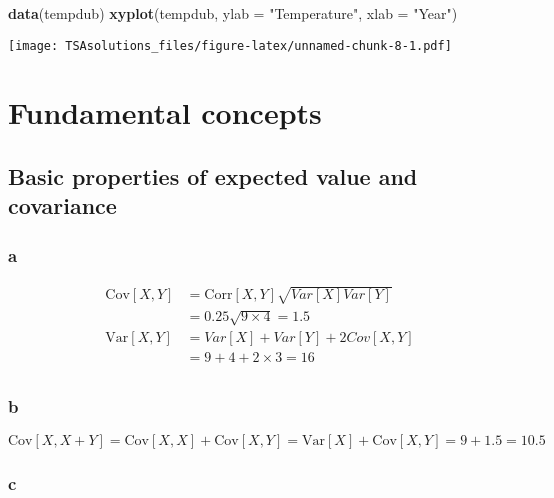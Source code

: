 \documentclass[]{book}
\newenvironment{Shaded}{\begin{snugshade}}{\end{snugshade}}
\newcommand{\KeywordTok}[1]{\textcolor[rgb]{0.13,0.29,0.53}{\textbf{{#1}}}}
\newcommand{\DataTypeTok}[1]{\textcolor[rgb]{0.13,0.29,0.53}{{#1}}}
\newcommand{\StringTok}[1]{\textcolor[rgb]{0.31,0.60,0.02}{{#1}}}
\newcommand{\NormalTok}[1]{{#1}}
\theoremstyle{definition}
\theoremstyle{definition}
\theoremstyle{remark}
\begin{document}
\begin{Shaded}
\begin{Highlighting}[]
\KeywordTok{data}\NormalTok{(tempdub)}
\KeywordTok{xyplot}\NormalTok{(tempdub, }\DataTypeTok{ylab =} \StringTok{"Temperature"}\NormalTok{, }\DataTypeTok{xlab =} \StringTok{"Year"}\NormalTok{)}
\end{Highlighting}
\end{Shaded}

\texttt{[image: TSAsolutions\_files/figure-latex/unnamed-chunk-8-1.pdf]}

\chapter{Fundamental concepts}\label{fundamental-concepts}

\section{Basic properties of expected value and
covariance}\label{basic-properties-of-expected-value-and-covariance}

\subsection*{a}\label{a}

\begin{align}
    \text{Cov}[X,Y] & = \text{Corr}[X,Y]\sqrt{Var[X]Var[Y]}\\
                    & = 0.25 \sqrt{9 \times 4} = 1.5 \\
    \text{Var}[X,Y] & = Var[X]+Var[Y]+2Cov[X,Y]\\
                    & = 9 + 4 + 2 \times 3 = 16\\
    \end{align}

\subsection*{b}\label{b}

\[\text{Cov}[X, X+Y] = \text{Cov}[X,X] + \text{Cov}[X,Y] =
  \text{Var}[X] + \text{Cov}[X,Y] = 9 + 1.5 = 10.5\]

\subsection*{c}\label{c}
\end{document}
